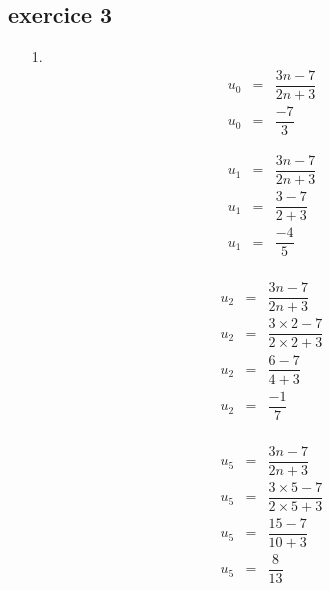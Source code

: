 \documentclass[11pt]{article}
\begin{document}
\begin{multicols}{2}
  \section{exercice 3}
  \begin{enumerate}
  \item[1.] 
    \begin{eqnarray*}
      u_0 &=& \dfrac{3n - 7}{2n + 3} \\
      u_0 &=& \dfrac{- 7}{3}
    \end{eqnarray*}
    
    \begin{eqnarray*}
      u_1 &=& \dfrac{3n - 7}{2n + 3} \\
      u_1 &=& \dfrac{3 - 7}{2 + 3} \\
      u_1 &=& \dfrac{- 4}{5} \\
    \end{eqnarray*}
    
    \begin{eqnarray*}
      u_2 &=& \dfrac{3n - 7}{2n + 3} \\
      u_2 &=& \dfrac{3\times 2 - 7}{2\times 2 + 3} \\
      u_2 &=& \dfrac{6 - 7}{4 + 3} \\
      u_2 &=& \dfrac{- 1}{7} \\
    \end{eqnarray*}
    
    \begin{eqnarray*}
      u_5 &=& \dfrac{3n - 7}{2n + 3} \\
      u_5 &=& \dfrac{3\times 5 - 7}{2\times 5 + 3} \\
      u_5 &=& \dfrac{15 - 7}{10 + 3} \\
      u_5 &=& \dfrac{8}{13}
    \end{eqnarray*}
  \end{enumerate}
\end{multicols}
\end{document}
